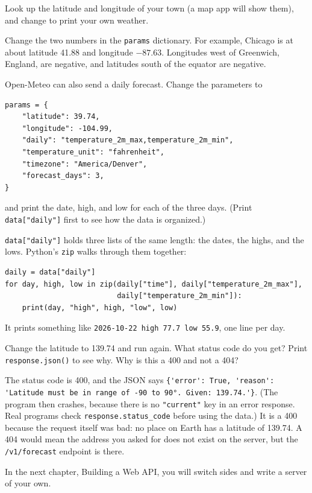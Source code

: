 \begin{Exercise}[title={Your Town}, label=webapi_town]
Look up the latitude and longitude of your town (a map app will show them), and change  to
print your own weather.
\end{Exercise}
\begin{Answer}[ref=webapi_town]
Change the two numbers in the \verb|params| dictionary. For example, Chicago is at about latitude 41.88 and
longitude $-87.63$. Longitudes west of Greenwich, England, are negative, and latitudes south of the equator are
negative.
\end{Answer}

\begin{Exercise}[title={A Three-Day Forecast}, label=webapi_forecast]
Open-Meteo can also send a daily forecast. Change the parameters to
\begin{verbatim}
params = {
    "latitude": 39.74,
    "longitude": -104.99,
    "daily": "temperature_2m_max,temperature_2m_min",
    "temperature_unit": "fahrenheit",
    "timezone": "America/Denver",
    "forecast_days": 3,
}
\end{verbatim}
and print the date, high, and low for each of the three days. (Print \verb|data["daily"]| first to see how the
data is organized.)
\end{Exercise}
\begin{Answer}[ref=webapi_forecast]
\verb|data["daily"]| holds three lists of the same length: the dates, the highs, and the lows. Python's
\verb|zip| walks through them together:
\begin{verbatim}
daily = data["daily"]
for day, high, low in zip(daily["time"], daily["temperature_2m_max"],
                          daily["temperature_2m_min"]):
    print(day, "high", high, "low", low)
\end{verbatim}
It prints something like \verb|2026-10-22 high 77.7 low 55.9|, one line per day.
\end{Answer}

\begin{Exercise}[title={A Bad Request}, label=webapi_bad]
Change the latitude to 139.74 and run  again. What status code do you get? Print
\verb|response.json()| to see why. Why is this a 400 and not a 404?
\end{Exercise}
\begin{Answer}[ref=webapi_bad]
The status code is 400, and the JSON says
\verb|{'error': True, 'reason': 'Latitude must be in range of -90 to 90°. Given: 139.74.'}|. (The program then
crashes, because there is no \verb|"current"| key in an error response. Real programs check
\verb|response.status_code| before using the data.) It is a 400 because the request itself was bad: no place on
Earth has a latitude of 139.74. A 404 would mean the address you asked for does not exist on the server, but the
\verb|/v1/forecast| endpoint is there.
\end{Answer}

In the next chapter, Building a Web API, you will switch sides and write a server of your own.
